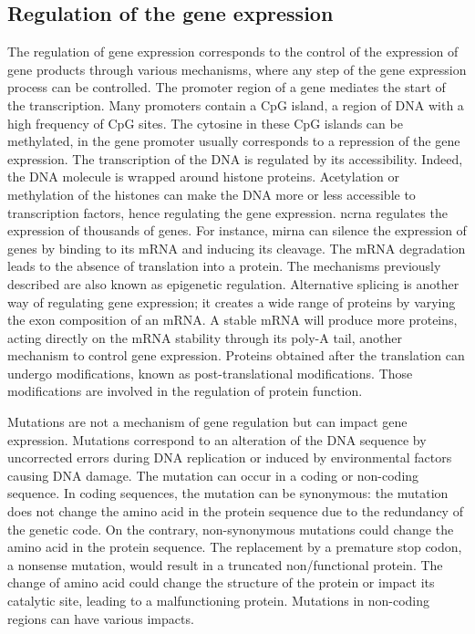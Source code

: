 \documentclass[../main.tex]{subfiles}
\begin{document}
	\subsection{Regulation of the gene expression}\label{subsec:gene_regulation}
		The regulation of gene expression corresponds to the control of the expression of gene products through various mechanisms,
		where any step of the gene expression process can be controlled.
		The promoter region of a gene mediates the start of the transcription.
		Many promoters contain a CpG island, a region of DNA with a high frequency of CpG sites.
		The cytosine in these CpG islands can be methylated,  in the gene promoter usually corresponds to a repression of the gene expression.
		The transcription of the DNA is regulated by its accessibility.
		Indeed, the DNA molecule is wrapped around histone proteins.
		Acetylation or methylation of the histones can make the DNA more or less accessible to transcription factors, hence regulating the gene expression.
		\Gls{ncrna} regulates the expression of thousands of genes.
		For instance, \gls{mirna} can silence the expression of genes by binding to its mRNA and inducing its cleavage.
		The mRNA degradation leads to the absence of translation into a protein.
		The mechanisms previously described are also known as epigenetic regulation.
		Alternative splicing is another way of regulating gene expression; it creates a wide range of proteins by varying the exon composition of an mRNA\@.
		A stable mRNA will produce more proteins, acting directly on the mRNA stability through its poly-A tail, another mechanism to control gene expression.
		Proteins obtained after the translation can undergo modifications, known as post-translational modifications.
		Those modifications are involved in the regulation of protein function.

		Mutations are not a mechanism of gene regulation but can impact gene expression.
		Mutations correspond to an alteration of the DNA sequence by uncorrected errors during DNA replication or induced by environmental factors causing DNA damage.
		The mutation can occur in a coding or non-coding sequence.
		In coding sequences, the mutation can be synonymous: the mutation does not change the amino acid in the protein sequence due to the redundancy of the genetic code.
		On the contrary, non-synonymous mutations could change the amino acid in the protein sequence.
		The replacement by a premature stop codon, a nonsense mutation, would result in a truncated non\-/functional protein.
		The change of amino acid could change the structure of the protein or impact its catalytic site, leading to a malfunctioning protein.
		Mutations in non-coding regions can have various impacts.
\end{document}

